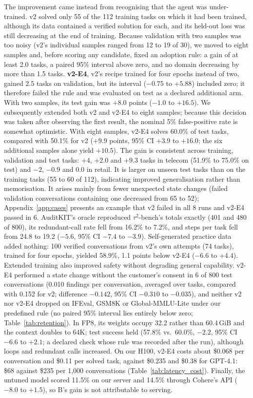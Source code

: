 \documentclass[11pt]{article}
\begin{document}
The improvement came instead from recognising that the agent was under-trained. v2 solved only 55 of the 112 training tasks on which it had been trained, although its data contained a verified solution for each, and its held-out loss was still decreasing at the end of training. Because validation with two samples was too noisy (v2's individual samples ranged from 12 to 19 of 30), we moved to eight samples and, before scoring any candidate, fixed an adoption rule: a gain of at least 2.0 tasks, a paired 95\% interval above zero, and no domain decreasing by more than 1.5 tasks. \textbf{v2-E4}, v2's recipe trained for four epochs instead of two, gained 2.5 tasks on validation, but its interval ($-0.75$ to $+5.88$) included zero; it therefore failed the rule and was evaluated on test as a declared additional arm. With two samples, its test gain was $+8.0$ points ($-1.0$ to $+16.5$). We subsequently extended both v2 and v2-E4 to eight samples; because this decision was taken after observing the first result, the nominal 5\% false-positive rate is somewhat optimistic. With eight samples, v2-E4 solves 60.0\% of test tasks, compared with 50.1\% for v2 ($+9.9$ points, 95\% CI $+3.9$ to $+16.0$; the six additional samples alone yield $+10.5$). The gain is consistent across training, validation and test tasks: $+4$, $+2.0$ and $+9.3$ tasks in telecom (51.9\% to 75.0\% on test) and $-2$, $-0.9$ and $0.0$ in retail. It is larger on unseen test tasks than on the training tasks (55 to 60 of 112), indicating improved generalisation rather than memorisation. It arises mainly from fewer unexpected state changes (failed validation conversations containing one decreased from 65 to 52); Appendix~\ref{app:cases} presents an example that v2 failed in all 8 runs and v2-E4 passed in 6. AuditKIT's oracle reproduced $\tau^2$-bench's totals exactly (401 and 480 of 800), its redundant-call rate fell from 16.2\% to 7.2\%, and steps per task fell from 24.8 to 19.2 ($-5.6$, 95\% CI $-7.4$ to $-3.9$). Self-generated practice data added nothing: 100 verified conversations from v2's own attempts (74 tasks), trained for four epochs, yielded 58.9\%, 1.1 points below v2-E4 ($-6.6$ to $+4.4$). Extended training also improved safety without degrading general capability. v2-E4 performed a state change without the customer's consent in 6 of 800 test conversations (0.010 findings per conversation, averaged over tasks, compared with 0.152 for v2; difference $-0.142$, 95\% CI $-0.310$ to $-0.035$), and neither v2 nor v2-E4 dropped on IFEval, GSM8K or Global-MMLU-Lite under our predefined rule (no paired 95\% interval lies entirely below zero; Table~\ref{tab:retention}). In FP8, its weights occupy 32.2 rather than 60.4\,GiB and the context doubles to 64K; test success held (57.8\% vs.\ 60.0\%, $-2.2$, 95\% CI $-6.6$ to $+2.1$; a declared check whose rule was recorded after the run), although loops and redundant calls increased. On our H100, v2-E4 costs about \$0.068 per conversation and \$0.11 per solved task, against \$0.235 and \$0.38 for GPT-4.1: \$68 against \$235 per 1,000 conversations (Table~\ref{tab:latency_cost}). Finally, the untuned model scored 11.5\% on our server and 14.5\% through Cohere's API ($-8.0$ to $+1.5$), so B's gain is not attributable to serving.
\end{document}
